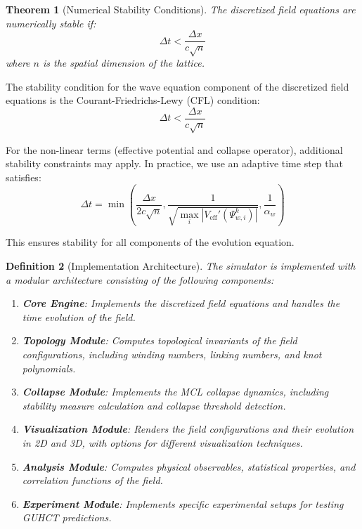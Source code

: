 \documentclass[11pt,a4paper]{article}
\makeatletter
\newtheorem{theorem}{Theorem}[section]
\newtheorem{definition}[theorem]{Definition}
\renewenvironment{proof}[1][\proofname]{\par
  \pushQED{\qed}%
  \normalfont \topsep6\p@\@plus6\p@\relax
  \trivlist
  \item[\hskip\labelsep
        \itshape
    #1\@addpunct{.}]\ignorespaces
}{%
  \popQED\endtrivlist\@endpefalse
}
\makeatother
\begin{document}
\begin{theorem}[Numerical Stability Conditions]
\label{thm:numerical_stability}
The discretized field equations are numerically stable if:
\begin{equation}
\Delta t < \frac{\Delta x}{c\sqrt{n}}
\end{equation}
where $n$ is the spatial dimension of the lattice.
\end{theorem}

\begin{proof}
The stability condition for the wave equation component of the discretized field equations is the Courant-Friedrichs-Lewy (CFL) condition:
\begin{equation}
\Delta t < \frac{\Delta x}{c\sqrt{n}}
\end{equation}

For the non-linear terms (effective potential and collapse operator), additional stability constraints may apply. In practice, we use an adaptive time step that satisfies:
\begin{equation}
\Delta t = \min\left(\frac{\Delta x}{2c\sqrt{n}}, \frac{1}{\sqrt{\max_i |V_{\text{eff}}'(\Psi_{w,i}^k)|}}, \frac{1}{\alpha_w}\right)
\end{equation}

This ensures stability for all components of the evolution equation.
\end{proof}

\begin{definition}[Implementation Architecture]
\label{def:implementation_architecture}
The simulator is implemented with a modular architecture consisting of the following components:
\begin{enumerate}
    \item \textbf{Core Engine}: Implements the discretized field equations and handles the time evolution of the field.
    
    \item \textbf{Topology Module}: Computes topological invariants of the field configurations, including winding numbers, linking numbers, and knot polynomials.
    
    \item \textbf{Collapse Module}: Implements the MCL collapse dynamics, including stability measure calculation and collapse threshold detection.
    
    \item \textbf{Visualization Module}: Renders the field configurations and their evolution in 2D and 3D, with options for different visualization techniques.
    
    \item \textbf{Analysis Module}: Computes physical observables, statistical properties, and correlation functions of the field.
    
    \item \textbf{Experiment Module}: Implements specific experimental setups for testing GUHCT predictions.
\end{enumerate}
\end{definition}
\end{document}
